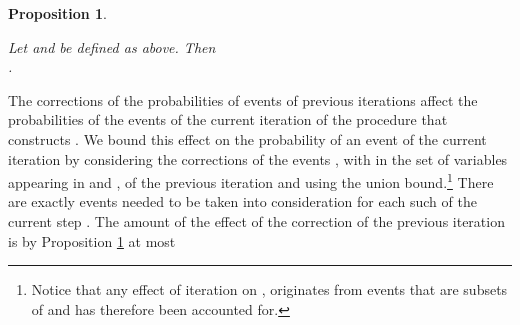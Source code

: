 \documentclass[11pt]{article}
\newtheorem{proposition}{Proposition}[section]
\newcommand{\qed}{\hfill \mbox{\raggedright \rule{2mm}{3mm}}}
\newenvironment{proof}{\noindent{\bf Proof.}}{\qed}
\begin{document}
\vspace*{-0.1cm}
\begin{proposition}\label{transf_fraction}
\begin{sloppypar}
Let  and  be defined as above. 
Then  \\
.
\end{sloppypar}
\end{proposition}
\vspace*{-0.1cm}

\begin{comment}
\begin{proof}
Consider again the random experiment of the proof of Proposition \ref{level-ratio}. Recall that
. Note that again both  are  and . In the ball tossing experiment, the probability of success of ball  in the case where the capacities of the cheap bins is  is at most  the probability of success of the same event in the case where the capacities of the cheap bins is  (we are very generous here). So the ratio  using that .
\end{proof}
\end{comment}

The corrections of the  probabilities of events of previous iterations
affect the probabilities of the events of the current iteration of the
procedure  that  constructs  .   We  bound  this  effect  on  the
probability of  an event  of the  current iteration 
by     considering      the     corrections     of      the     events
, with  in the
set of variables appearing in  and , of
the previous iteration and using the union bound.\footnote{Notice that
  any  effect of iteration    on , originates
  from events that are subsets of  and has therefore
  been  accounted for.}   There are  exactly   events needed  to be
taken into consideration for  each such  of the current
step .  The amount of the  effect of the correction of the previous
iteration   is   by    Proposition   \ref{transf_fraction}   at   most
\end{document}
